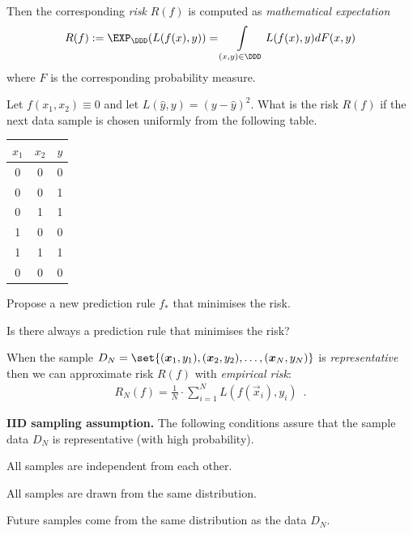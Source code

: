 \documentclass[landscape,footrule]{foils}
\begin{document}
Then the corresponding \emph{risk} $R(f)$ is computed as \emph{mathematical expectation}
\begin{align*}
 R(f):=\EXP_\DDD(L(f(x), y))=\int\limits_{(x,y)\in\DDD} L(f(x), y) dF(x,y)
\end{align*}   
where $F$ is the corresponding probability measure.


\begin{triangles}
\item Let $f(x_1,x_2)\equiv 0$ and let $L(\hat{y}, y)= (y-\hat{y})^2$. What is the risk $R(f)$ if the next data sample is chosen uniformly from the following table.
\bigskip

\begin{center}
\begin{tabular}{|c|c|c|}
\hline
$x_1$ & $x_2$ & $y$\\ 
\hline
0 & 0 & 0\\
0 & 0 & 1\\
0 & 1 & 1\\
1 & 0 & 0\\
1 & 1 & 1\\
0 & 0 & 0\\
\hline
\end{tabular}
\bigskip

\end{center}
\item Propose a new prediction rule $f_*$ that minimises the risk. 
\item Is there always a prediction rule that minimises the risk?
\end{triangles}


When the sample $D_N=\set{(\vec{x}_1,y_1),(\vec{x}_2,y_2),\ldots, (\vec{x}_N, y_N)}$ is \emph{representative} then we can approximate risk $R(f)$ with \emph{empirical risk}:
\begin{align*}
  R_N(f)=\frac{1}{N}\cdot\sum_{i=1}^N L(f(\vec{x}_i), y_i)\enspace.
\end{align*} 
\hspace*{1cm}

\textbf{IID sampling assumption.} The following conditions assure that the sample data $D_N$ is representative (with high probability).
\begin{triangles}
\item All samples are independent from each other. 
\item All samples are drawn from the same distribution.
\item Future samples come from the same distribution as the data $D_N$.
\end{triangles}
\end{document}
